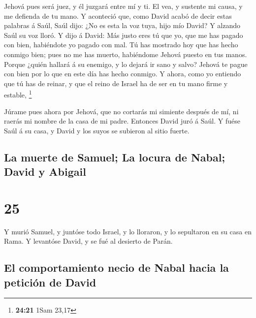  Jehová pues será juez, y él juzgará entre mí y ti. El
vea, y sustente mi causa, y me defienda de tu mano.  Y
aconteció que, como David acabó de decir estas palabras á Saúl, Saúl
dijo: ¿No es esta la voz tuya, hijo mío David? Y alzando Saúl su voz
lloró.  Y dijo á David: Más justo eres tú que yo, que me
has pagado con bien, habiéndote yo pagado con mal.  Tú
has mostrado hoy que has hecho conmigo bien; pues no me has muerto,
habiéndome Jehová puesto en tus manos.  Porque ¿quién
hallará á su enemigo, y lo dejará ir sano y salvo? Jehová te pague con
bien por lo que en este día has hecho conmigo.  Y ahora,
como yo entiendo que tú has de reinar, y que el reino de Israel ha de
ser en tu mano firme y estable, \footnote{\textbf{24:21} 1Sam 23,17}

 Júrame pues ahora por Jehová, que no cortarás mi
simiente después de mí, ni raerás mi nombre de la casa de mi padre.
Entonces David juró á Saúl. Y fuése Saúl á su casa, y David y los suyos
se subieron al sitio fuerte.

\hypertarget{la-muerte-de-samuel-la-locura-de-nabal-david-y-abigail}{%
\subsection{La muerte de Samuel; La locura de Nabal; David y
Abigail}\label{la-muerte-de-samuel-la-locura-de-nabal-david-y-abigail}}

\hypertarget{section-24}{%
\section{25}\label{section-24}}

 Y murió Samuel, y juntóse todo Israel, y lo lloraron, y
lo sepultaron en su casa en Rama. Y levantóse David, y se fué al
desierto de Parán.

\hypertarget{el-comportamiento-necio-de-nabal-hacia-la-peticiuxf3n-de-david}{%
\subsection{El comportamiento necio de Nabal hacia la petición de
David}\label{el-comportamiento-necio-de-nabal-hacia-la-peticiuxf3n-de-david}}

